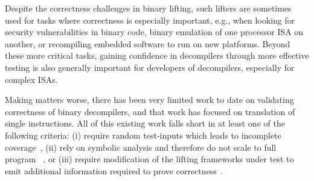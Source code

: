 Despite the correctness challenges in binary lifting, such lifters are sometimes
used for tasks where correctness is especially important, e.g., when looking for security
vulnerabilities in binary code, binary emulation of one processor ISA on another,
or recompiling embedded software to run on new platforms.
%
Beyond these more critical tasks, gaining confidence in decompilers through more 
effective testing is also generally important for developers of decompilers,
especially for complex ISAs.
%

Making matters worse, there has been very limited work to date on validating correctness of binary
decompilers, and that work has focused on translation of single instructions. 
All of this existing work falls short in at least
one of the following criteria: (i) require random test-inputs which leads to
incomplete coverage~\cite{Martignoni:ISSTA2009,
Martignoni:ISSTA2010,CLSS2015}, (ii) rely on symbolic analysis
and therefore do not scale to full program
\tv~\cite{Martignoni:ASPLOS2012,ASE2017}, or (iii) require modification of the
lifting frameworks under test to emit additional information required to prove
correctness~\cite{Galois:SPISA19}.




